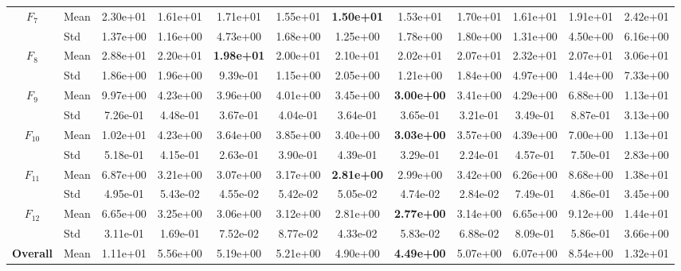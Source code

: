 \begin{center}
\begin{longtable}{clcccccccccc}
\midrule
$F_{7}$ & Mean & 2.30e+01 & 1.61e+01 & 1.71e+01 & 1.55e+01 & \textbf{1.50e+01} & 1.53e+01 & 1.70e+01 & 1.61e+01 & 1.91e+01 & 2.42e+01 \\
 & Std & 1.37e+00 & 1.16e+00 & 4.73e+00 & 1.68e+00 & 1.25e+00 & 1.78e+00 & 1.80e+00 & 1.31e+00 & 4.50e+00 & 6.16e+00 \\
\midrule
$F_{8}$ & Mean & 2.88e+01 & 2.20e+01 & \textbf{1.98e+01} & 2.00e+01 & 2.10e+01 & 2.02e+01 & 2.07e+01 & 2.32e+01 & 2.07e+01 & 3.06e+01 \\
 & Std & 1.86e+00 & 1.96e+00 & 9.39e-01 & 1.15e+00 & 2.05e+00 & 1.21e+00 & 1.84e+00 & 4.97e+00 & 1.44e+00 & 7.33e+00 \\
\midrule
$F_{9}$ & Mean & 9.97e+00 & 4.23e+00 & 3.96e+00 & 4.01e+00 & 3.45e+00 & \textbf{3.00e+00} & 3.41e+00 & 4.29e+00 & 6.88e+00 & 1.13e+01 \\
 & Std & 7.26e-01 & 4.48e-01 & 3.67e-01 & 4.04e-01 & 3.64e-01 & 3.65e-01 & 3.21e-01 & 3.49e-01 & 8.87e-01 & 3.13e+00 \\
\midrule
$F_{10}$ & Mean & 1.02e+01 & 4.23e+00 & 3.64e+00 & 3.85e+00 & 3.40e+00 & \textbf{3.03e+00} & 3.57e+00 & 4.39e+00 & 7.00e+00 & 1.13e+01 \\
 & Std & 5.18e-01 & 4.15e-01 & 2.63e-01 & 3.90e-01 & 4.39e-01 & 3.29e-01 & 2.24e-01 & 4.57e-01 & 7.50e-01 & 2.83e+00 \\
\midrule
$F_{11}$ & Mean & 6.87e+00 & 3.21e+00 & 3.07e+00 & 3.17e+00 & \textbf{2.81e+00} & 2.99e+00 & 3.42e+00 & 6.26e+00 & 8.68e+00 & 1.38e+01 \\
 & Std & 4.95e-01 & 5.43e-02 & 4.55e-02 & 5.42e-02 & 5.05e-02 & 4.74e-02 & 2.84e-02 & 7.49e-01 & 4.86e-01 & 3.45e+00 \\
\midrule
$F_{12}$ & Mean & 6.65e+00 & 3.25e+00 & 3.06e+00 & 3.12e+00 & 2.81e+00 & \textbf{2.77e+00} & 3.14e+00 & 6.65e+00 & 9.12e+00 & 1.44e+01 \\
 & Std & 3.11e-01 & 1.69e-01 & 7.52e-02 & 8.77e-02 & 4.33e-02 & 5.83e-02 & 6.88e-02 & 8.09e-01 & 5.86e-01 & 3.66e+00 \\
\midrule
\textbf{Overall} & Mean & 1.11e+01 & 5.56e+00 & 5.19e+00 & 5.21e+00 & 4.90e+00 & \textbf{4.49e+00} & 5.07e+00 & 6.07e+00 & 8.54e+00 & 1.32e+01 \\
\bottomrule
\end{longtable}
\end{center}